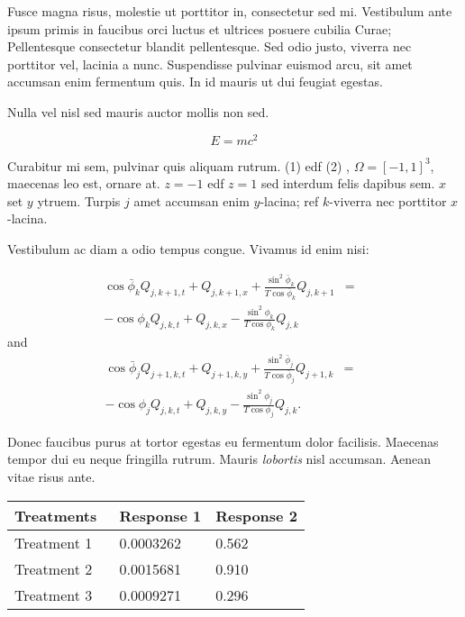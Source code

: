 \documentclass[portrait]{article}
\begin{document}
\begin{multicols}{2}
Fusce magna risus, molestie ut porttitor in, consectetur sed
mi. Vestibulum ante ipsum primis in faucibus orci luctus et ultrices
posuere cubilia Curae; Pellentesque consectetur blandit
pellentesque. Sed odio justo, viverra nec porttitor vel, lacinia a
nunc. Suspendisse pulvinar euismod arcu, sit amet accumsan enim
fermentum quis. In id mauris ut dui feugiat egestas. 


Nulla vel nisl sed mauris auctor mollis non sed. 

\begin{equation}
E = mc^{2}
\label{eqn:Einstein}
\end{equation}

Curabitur mi sem, pulvinar quis aliquam rutrum. (1) edf (2) ,
$\Omega=[-1,1]^3$, maecenas leo est, ornare at. $z=-1$ edf $z=1$ sed
interdum felis dapibus sem. $x$ set $y$ ytruem.  Turpis $j$ amet
accumsan enim $y$-lacina; ref $k$-viverra nec porttitor $x$-lacina.

Vestibulum ac diam a odio tempus congue. Vivamus id enim nisi:

\begin{eqnarray}
\cos\bar{\phi}_k Q_{j,k+1,t} + Q_{j,k+1,x}+\frac{\sin^2\bar{\phi}_k}{T\cos\bar{\phi}_k} Q_{j,k+1} &=&\nonumber\\ 
-\cos\phi_k Q_{j,k,t} + Q_{j,k,x}-\frac{\sin^2\phi_k}{T\cos\phi_k} Q_{j,k}\label{edgek}
\end{eqnarray}
and
\begin{eqnarray}
\cos\bar{\phi}_j Q_{j+1,k,t} + Q_{j+1,k,y}+\frac{\sin^2\bar{\phi}_j}{T\cos\bar{\phi}_j} Q_{j+1,k}&=&\nonumber \\
-\cos\phi_j Q_{j,k,t} + Q_{j,k,y}-\frac{\sin^2\phi_j}{T\cos\phi_j} Q_{j,k}.\label{edgej}
\end{eqnarray} 

Donec faucibus purus at tortor egestas eu fermentum dolor
facilisis. Maecenas tempor dui eu neque fringilla rutrum. Mauris
\emph{lobortis} nisl accumsan. Aenean vitae risus ante.
%

\vspace{1cm}
\begin{center}
\begin{tabular}{l l l}
\toprule
\textbf{Treatments}~ & \textbf{Response 1} & \textbf{Response 2}\\
\midrule
Treatment 1 & 0.0003262 & 0.562 \\
Treatment 2 & 0.0015681 & 0.910 \\
Treatment 3 & 0.0009271 & 0.296 \\
\bottomrule
\end{tabular}
\end{center}
\vspace{1cm}


\end{multicols}
\end{document}
